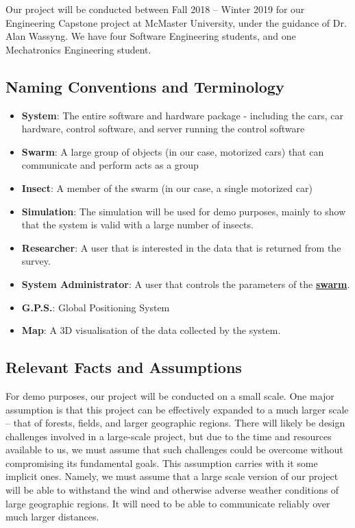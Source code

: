 \documentclass[11pt]{article}
\begin{document}
Our project will be conducted between Fall 2018 – Winter 2019 for our Engineering Capstone project at McMaster University, under the guidance of Dr. Alan Wassyng. We have four Software Engineering students, and one Mechatronics Engineering student.

\subsection{Naming Conventions and Terminology}

\label{sec:definitions}
\begin{itemize}
\item \textbf{System}: The entire software and hardware package - including the cars,
car hardware, control software, and server running the control software
\item \textbf{Swarm}: A large group of objects (in our case, motorized cars) that can communicate and perform acts as a group
\item \textbf{Insect}: A member of the swarm (in our case, a single motorized car)
\item \textbf{Simulation}: The simulation will be used for demo purposes, mainly to show that
the system is valid with a large number of insects.
\item \textbf{Researcher}: A user that is interested in the data that is returned from the survey.
\item \textbf{System Administrator}: A user that controls the parameters of the \hyperref[sec:definitions]{\textbf{swarm}}.
\item \textbf{G.P.S.}: Global Positioning System
\item \textbf{Map}: A 3D visualisation of the data collected by the system.
\end{itemize}

\subsection{Relevant Facts and Assumptions}

For demo purposes, our project will be conducted on a small scale. One major assumption is that this project can be effectively expanded to a much larger scale – that of forests, fields, and larger geographic regions. There will likely be design challenges involved in a large-scale project, but due to the time and resources available to us, we must assume that such challenges could be overcome without compromising its fundamental goals. This assumption carries with it some implicit ones. Namely, we must assume that a large scale version of our project will be able to withstand the wind and otherwise adverse weather conditions of large geographic regions. It will need to be able to communicate reliably over much larger distances.\\
\end{document}
